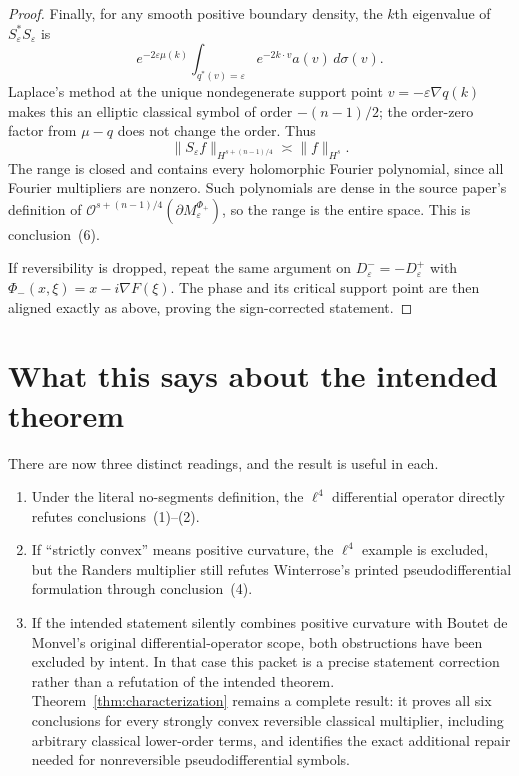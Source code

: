 \documentclass[11pt]{article}
\theoremstyle{remark}
\newcommand{\eps}{\varepsilon}
\newcommand{\cO}{\mathcal O}
\begin{document}
\begin{proof}
Finally, for any smooth positive boundary density, the $k$th eigenvalue of
$S_\eps^*S_\eps$ is
\[
 e^{-2\eps\mu(k)}
 \int_{q^*(v)=\eps}e^{-2k\cdot v}a(v)\,d\sigma(v).
\]
Laplace's method at the unique nondegenerate support point
$v=-\eps\nabla q(k)$ makes this an elliptic classical symbol of order
$-(n-1)/2$; the order-zero factor from $\mu-q$ does not change the order.
Thus
\[
 \|S_\eps f\|_{H^{s+(n-1)/4}}
 \asymp \|f\|_{H^s}.
\]
The range is closed and contains every holomorphic Fourier polynomial, since
all Fourier multipliers are nonzero.  Such polynomials are dense in the
source paper's definition of
$\cO^{s+(n-1)/4}(\partial M_\eps^{\Phi_+})$, so the range is the entire space.
This is conclusion~(6).

If reversibility is dropped, repeat the same argument on
$D_\eps^-=-D_\eps^+$ with
$\Phi_-(x,\xi)=x-i\nabla F(\xi)$.  The phase and its critical support point
are then aligned exactly as above, proving the sign-corrected statement.
\end{proof}

\section{What this says about the intended theorem}

There are now three distinct readings, and the result is useful in each.
\begin{enumerate}
\item Under the literal no-segments definition, the $\ell^4$ differential
      operator directly refutes conclusions~(1)--(2).
\item If ``strictly convex'' means positive curvature, the $\ell^4$ example is
      excluded, but the Randers multiplier still refutes Winterrose's printed
      pseudodifferential formulation through conclusion~(4).
\item If the intended statement silently combines positive curvature with
      Boutet de Monvel's original differential-operator scope, both
      obstructions have been excluded by intent.  In that case this packet is
      a precise statement correction rather than a refutation of the intended
      theorem.  Theorem~\ref{thm:characterization} remains a complete result:
      it proves all six conclusions for every strongly convex reversible
      classical multiplier, including arbitrary classical lower-order terms,
      and identifies the exact additional repair needed for nonreversible
      pseudodifferential symbols.
\end{enumerate}
\end{document}
